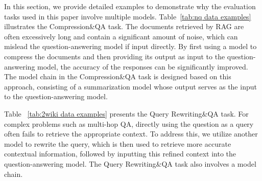 \begin{table*}[t]
    \centering
    \caption{An Example for HotpotQA datasets in Active RAG task.}
    \label{tab:hotpotqa data examples}
\end{table*}

In this section, we provide detailed examples to demonstrate why the evaluation tasks used in this paper involve multiple models. Table~\ref{tab:nq data examples} illustrates the Compression\&QA task. The documents retrieved by RAG are often excessively long and contain a significant amount of noise, which can mislead the question-answering model if input directly. By first using a model to compress the documents and then providing its output as input to the question-answering model, the accuracy of the responses can be significantly improved. The model chain in the Compression\&QA task is designed based on this approach, consisting of a summarization model whose output serves as the input to the question-answering model.

Table ~\ref{tab:2wiki data examples} presents the Query Rewriting\&QA task. For complex problems such as multi-hop QA, directly using the question as a query often fails to retrieve the appropriate context. To address this, we utilize another model to rewrite the query, which is then used to retrieve more accurate contextual information, followed by inputting this refined context into the question-answering model. The Query Rewriting\&QA task also involves a model chain.

